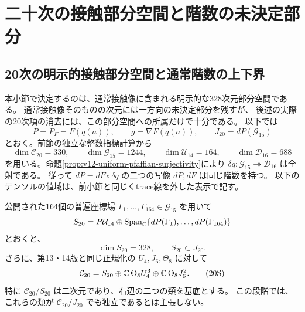 \section{二十次の接触部分空間と階数の未決定部分}
\label{sec:v15-contact-subspace}

\subsection{20次の明示的接触部分空間と通常階数の上下界}
\label{subsec:v15-twentieth-contact-subspace}

本小節で決定するのは、通常接触像に含まれる明示的な328次元部分空間である。
通常接触像そのものの次元には一方向の未決定部分を残すが、
後述の実際の20次項の消去には、この部分空間への所属だけで十分である。
以下では
\[
 P=P_F=F(q(a)),\qquad g=\nabla F(q(a)),\qquad
 J_{20}=dP(\mathcal G_{15})
\]
とおく。前節の独立な整数指標計算から
\[
 \dim\mathcal C_{20}=330,\qquad
 \dim\mathcal G_{15}=1244,\qquad
 \dim\mathcal U_{14}=164,\qquad
 \dim\mathcal D_{16}=688
\]
を用いる。命題\ref{prop:v12-uniform-pfaffian-surjectivity}により
$\delta q:\mathcal G_{15}\twoheadrightarrow\mathcal D_{16}$ は全射である。
従って $dP=dF\circ\delta q$ の二つの写像 $dP,dF$ は同じ階数を持つ。
以下のテンソルの値域は、前小節と同じくtrace線を外した表示で記す。

\begin{proposition}
\label{prop:v15-twentieth-contact-subspace}
公開された164個の普遍座標場
$\Gamma_1,\ldots,\Gamma_{164}\in\mathcal G_{15}$ を用いて
\[
 S_{20}=P\mathcal U_{14}\oplus
     \operatorname{Span}_{\mathbb C}\{dP(\Gamma_1),\ldots,dP(\Gamma_{164})\}
\]
とおくと、
\[
 \dim S_{20}=328,\qquad S_{20}\subset J_{20}.
\]
さらに、第13・14版と同じ正規化の $U_4,J_6,\Theta_8$ に対して
\[
 \mathcal C_{20}
   =S_{20}\oplus
       \mathbb C\,\Theta_8U_4^3\oplus\mathbb C\,\Theta_8J_6^2.
 \tag{20S}\label{eq:v15-twentieth-certified-splitting}
\]
特に $\mathcal C_{20}/S_{20}$ は二次元であり、右辺の二つの類を基底とする。
この段階では、これらの類が $\mathcal C_{20}/J_{20}$ でも独立であるとは主張しない。
\end{proposition}

